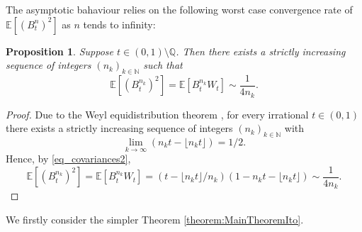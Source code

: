 \documentclass[a4paper,11pt,reqno]{amsart}
\theoremstyle{plain}
\newtheorem{proposition}[theorem]{Proposition}
\def\N{\mathbb{N}}
\def\Q{\mathbb{Q}}
\def\ex{\mathbb{E}}
\numberwithin{equation}{section}
\begin{document}
The asymptotic bahaviour relies on the following worst case convergence rate of $\ex[(B^{n}_t)^2]$ as $n$ tends to infinity:

\begin{proposition}\label{prop:Weyl}
Suppose $t \in (0,1) \setminus \Q$. Then there exists a strictly increasing sequence of integers $(n_k)_{k \in \N}$ such that
\[
\ex[(B^{n_k}_t)^2] = \ex[B^{n_k}_t W_t] \sim \frac{1}{4n_k}.
\]
\end{proposition}


\begin{proof}
Due to the Weyl equidistribution theorem \cite{Weyl}, for every irrational $t \in (0,1)$ there exists a strictly increasing sequence of integers $(n_k)_{k \in \N}$ with 
$$
\lim_{k \rightarrow \infty} \left(n_k t - \lfloor n_k t\rfloor\right) = 1/2.
$$
Hence, by \eqref{eq_covariances2},
$$
\ex[(B^{n_k}_t)^2] = \ex[B^{n_k}_t W_t] = (t-\lfloor n_k t \rfloor/n_k)(1-n_k t - \lfloor n_k t \rfloor) \sim \frac{1}{4 n_k}.
$$
\end{proof}

We firstly consider the simpler Theorem \ref{theorem:MainTheoremIto}.
\end{document}
